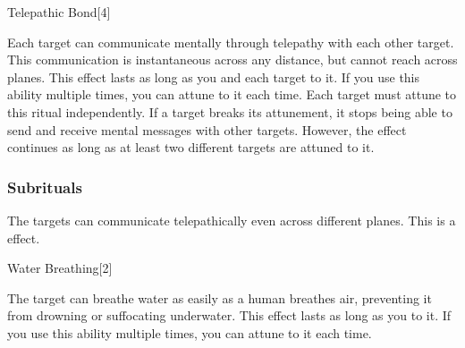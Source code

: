 \begin{spellsection}{Telepathic Bond}[4]
\begin{spellcontent}
\begin{spelltargetinginfo}
\end{spelltargetinginfo}
\begin{spelleffects}
\spelleffect
Each target can communicate mentally through telepathy with each other target.
This communication is instantaneous across any distance, but cannot reach across planes.
This effect lasts as long as you and each target  to it.
If you use this ability multiple times, you can attune to it each time.
Each target must attune to this ritual independently.
If a target breaks its attunement, it stops being able to send and receive mental messages with other targets.
However, the effect continues as long as at least two different targets are attuned to it.
\end{spelleffects}
\end{spellcontent}
\begin{spellfooter}
\end{spellfooter}
\begin{spellsubcontent}
\end{spellsubcontent}
\end{spellsection}
\subsubsection{Subrituals}
The targets can communicate telepathically even across different planes.
This is a  effect.
\begin{spellsection}{Water Breathing}[2]
\begin{spellcontent}
\begin{spelltargetinginfo}
\end{spelltargetinginfo}
\begin{spelleffects}
\spelleffect
The target can breathe water as easily as a human breathes air, preventing it from drowning or suffocating underwater.
This effect lasts as long as you  to it.
If you use this ability multiple times, you can attune to it each time.
\end{spelleffects}
\end{spellcontent}
\begin{spellfooter}
\end{spellfooter}
\begin{spellsubcontent}
\end{spellsubcontent}
\end{spellsection}
